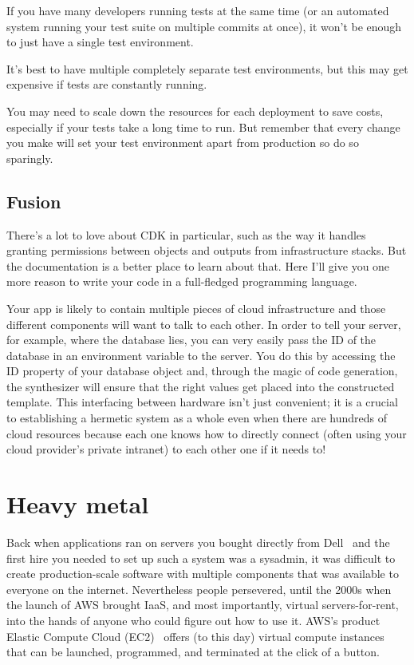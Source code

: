 \documentclass{article}
\newcommand{\infobox}[2]{
  \begin{tcolorbox}[width=\textwidth,colback={white},title={\strut\textbf{#1}},colbacktitle=blue!15,coltitle=black,boxrule=0.2pt,parbox=false]
    #2
  \end{tcolorbox}
}
\begin{document}
\infobox{More on remote tests}{
  If you have many developers running tests at the same time (or an automated system running your test suite on multiple commits at once), it won't be enough to just have a single test environment.

  It's best to have multiple completely separate test environments, but this may get expensive if tests are constantly running.

  You may need to scale down the resources for each deployment to save costs, especially if your tests take a long time to run.
  But remember that every change you make will set your test environment apart from production so do so sparingly.
}

\subsection{Fusion}

There's a lot to love about CDK in particular, such as the way it handles granting permissions between objects and outputs from infrastructure stacks.
But the documentation is a better place to learn about that.
Here I'll give you one more reason to write your code in a full-fledged programming language.

Your app is likely to contain multiple pieces of cloud infrastructure and those different components will want to talk to each other.
In order to tell your server, for example, where the database lies, you can very easily pass the ID of the database in an environment variable to the server.
You do this by accessing the ID property of your database object and, through the magic of code generation, the synthesizer will ensure that the right values get placed into the constructed template.
This interfacing between hardware isn't just convenient; it is a crucial to establishing a hermetic system as a whole even when there are hundreds of cloud resources because each one knows how to directly connect (often using your cloud provider's private intranet) to each other one if it needs to!

\section{Heavy metal}

Back when applications ran on servers you bought directly from Dell~\cite{joel-dell} and the first hire you needed to set up such a system was a sysadmin, it was difficult to create production-scale software with multiple components that was available to everyone on the internet.
Nevertheless people persevered, until the 2000s when the launch of AWS brought IaaS, and most importantly, virtual servers-for-rent, into the hands of anyone who could figure out how to use it.
AWS's product Elastic Compute Cloud (EC2)~\cite{ec2} offers (to this day) virtual compute instances that can be launched, programmed, and terminated at the click of a button.
\end{document}
